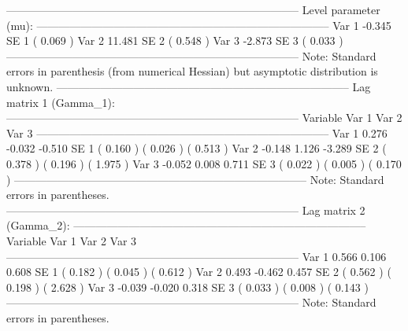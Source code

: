 \documentclass[article]{jss}
\begin{document}
\begin{CodeChunk}
\begin{CodeOutput}
--------------------------------------------------------------------------------
    Level parameter (mu):                                                                         
--------------------------------------------------------------------------------
        Var 1            -0.345     
         SE 1         (   0.069  )  
        Var 2            11.481     
         SE 2         (   0.548  )  
        Var 3            -2.873     
         SE 3         (   0.033  )  
--------------------------------------------------------------------------------
Note: Standard errors in parenthesis (from numerical Hessian) 
      but asymptotic distribution is unknown. 
--------------------------------------------------------------------------------
    Lag matrix 1 (Gamma_1):                                                                            
--------------------------------------------------------------------------------
      Variable         Var 1          Var 2          Var 3   
--------------------------------------------------------------------------------
      Var 1            0.276         -0.032         -0.510    
       SE 1        (   0.160  )   (   0.026  )   (   0.513  )  
      Var 2           -0.148          1.126         -3.289    
       SE 2        (   0.378  )   (   0.196  )   (   1.975  )  
      Var 3           -0.052          0.008          0.711    
       SE 3        (   0.022  )   (   0.005  )   (   0.170  )  
--------------------------------------------------------------------------------
Note: Standard errors in parentheses.                                                                
--------------------------------------------------------------------------------
    Lag matrix 2 (Gamma_2):                                                                            
--------------------------------------------------------------------------------
      Variable         Var 1          Var 2          Var 3   
--------------------------------------------------------------------------------
      Var 1            0.566          0.106          0.608    
       SE 1        (   0.182  )   (   0.045  )   (   0.612  )  
      Var 2            0.493         -0.462          0.457    
       SE 2        (   0.562  )   (   0.198  )   (   2.628  )  
      Var 3           -0.039         -0.020          0.318    
       SE 3        (   0.033  )   (   0.008  )   (   0.143  )  
--------------------------------------------------------------------------------
Note: Standard errors in parentheses.                                                                

\end{CodeOutput}
\end{CodeChunk}
\end{document}
